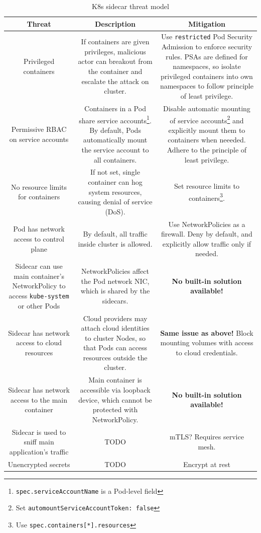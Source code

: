 \documentclass[english, 12pt, a4paper, sci, utf8, a-2b, online]{aaltothesis}
\begin{document}
\begin{table}[H]
  \sffamily%
  \centering

  \caption{K8s sidecar threat model}
  \label{table:threat-model}

  \begin{minipage}{\textwidth}
  \renewcommand{\thempfootnote}{\arabic{mpfootnote}}
  \begin{tabularx}{\textwidth}{CCC}
    \hline
    \textbf{Threat} & \textbf{Description} & \textbf{Mitigation}\\ \hline
    Privileged containers & If containers are given privileges, malicious actor can breakout from the container and escalate the attack on cluster. & Use \texttt{restricted} Pod Security Admission to enforce security rules. PSAs are defined for namespaces, so isolate privileged containers into own namespaces to follow principle of least privilege. \\ \hline
    Permissive RBAC on service accounts & Containers in a Pod share service accounts\footnote{\texttt{spec.serviceAccountName} is a Pod-level field}. By default, Pods automatically mount the service account to all containers. & Disable automatic mounting of service accounts\footnote{Set \texttt{automountServiceAccountToken: false}} and explicitly mount them to containers when neeeded. Adhere to the principle of least privilege. \\ \hline
    No resource limits for containers & If not set, single container can hog system resources, causing denial of service (DoS). & Set resource limits to containers\footnote{Use \texttt{spec.containers[*].resources}}. \\ \hline
    Pod has network access to control plane & By default, all traffic inside cluster is allowed. & Use NetworkPolicies as a firewall. Deny by default, and explicitly allow traffic only if needed. \\ \hline
    Sidecar can use main container's NetworkPolicy to access \texttt{kube-system} or other Pods & NetworkPolicies affect the Pod network NIC, which is shared by the sidecars. & \textbf{No built-in solution available!} \\ \hline
    Sidecar has network access to cloud resources & Cloud providers may attach cloud identities to cluster Nodes, so that Pods can access resources outside the cluster. & \textbf{Same issue as above!} Block mounting volumes with access to cloud credentials. \\ \hline
    Sidecar has network access to the main container & Main container is accessible via loopback device, which cannot be protected with NetworkPolicy. & \textbf{No built-in solution available!} \\ \hline
    Sidecar is used to sniff main application's traffic & TODO & mTLS? Requires service mesh. \\ \hline
    Unencrypted secrets & TODO & Encrypt at rest \\ \hline
  \end{tabularx}
\end{minipage}
\end{table}
\end{document}
